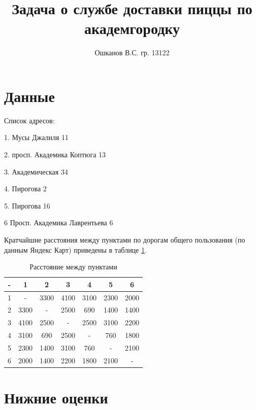 \documentclass[]{article}
\title{Задача о службе доставки пиццы по академгородку}
\author{Ошканов В.С. гр. 13122}
\begin{document}
\maketitle
\section{Данные}
Список адресов:

1. Мусы Джалиля 11

2. просп. Академика Коптюга 13

3. Академическая 34

4. Пирогова 2

5. Пирогова 16

6 Просп. Академика Лаврентьева 6


Кратчайшие расстояния между пунктами по дорогам общего пользования
(по данным Яндекс Карт) приведены в таблице \ref{tab:1}.


\begin{table}\caption{Расстояние между пунктами}\label{tab:1}
\centering
\begin{tabular}{|c|c|c|c|c|c|c|}
	\hline
- &    1  &   2  &   3  &   4  &   5  &  6  \\
\hline
1 &   -  & 3300 & 4100 & 3100 & 2300 & 2000 \\
\hline
2 & 3300 &  -   & 2500 &  690 & 1400 & 1400 \\
\hline
3 & 4100 & 2500 &  -   & 2500 & 3100 & 2200 \\
\hline
4	& 3100 &  690 & 2500 &  -   & 760  & 1800 \\
\hline
5	& 2300 & 1400 & 3100 &  760 &  -   & 2100 \\
\hline
6 & 2000 & 1400 & 2200 & 1800 & 2100 &  -   \\
\hline

\hline
\end{tabular}
\end{table}

\section{Нижние оценки}

\par\indent
\end{document}
